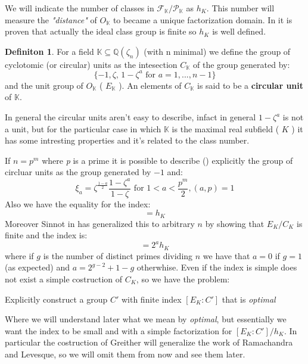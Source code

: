 \documentclass[]{article}
\theoremstyle{plain}
\theoremstyle{remark}
\theoremstyle{definition}
\newtheorem{deff}[teo]{Definiton}
\newcommand{\K}{\mathbb{K}}
\newcommand{\Q}{\mathbb{Q}}
\begin{document}
	We will indicate the number of classes in $ \mathcal{F}_\K / \mathcal{P}_\K $ as $ h_K $. This number will measure the \textit{"distance"} of $ O_\K $ to became a unique factorization domain. In \cite[Page~141]{RIN} it is proven that actually the ideal class group is finite so $ h_K $ is well defined. 

	
	\begin{deff}
		For a field $ \K \subseteq \Q (\zeta_n) $ (with n minimal) we define the group of cyclotomic (or circular) units as the intesection $ C_\K $ of the group generated by:
		\begin{equation*}
			\{ -1 ,  \zeta , \, 1 - \zeta ^a \text{ for } a = 1, ... , n-1 \}
		\end{equation*}
		and the unit group of $ O_\K $ ( $ E_{\K} $ ). An elements of $ C_\K $ is said to be a \textbf{circular unit} of $ \K $. 
	\end{deff}

	In general the circular units aren't easy to describe, infact in general $ 1 - \zeta ^a $ is not a unit, but for the particular case in which $ \K $ is the maximal real subfield ( $ K $ ) it has some intresting properties and it's related to the class number.
	
	
	If $ n=p^m $ where \textit{p} is a prime it is possible to describe (\cite[Lemma~8.1, Theorem~8.2]{CF}) explicitly the group of circluar units as the group generated by $ -1 $ and:
	\[
		\xi_a = \zeta^{ \frac{1-a}{2}} \frac{1 - \zeta ^a}{1 - \zeta } \text{ for } 1 < a < \frac{p^m}{2}, (a,p)=1
	\]
	Also we have the equality for the index:
	\begin{equation*}
		[ E_K : C_K ] = h_K
	\end{equation*}
	Moreover Sinnot in \cite{SIN} has generalized this to arbitrary $ n $ by showing that $ E_K / C_K $ is finite and the index is:
	 \begin{equation*}
		 [ E_K : C_K ] = 2^a h_K
	 \end{equation*}
	 where if $ g $ is the number of distinct primes dividing $ n $ we have that $ a=0 $ if $ g=1 $ (as expected) and $ a = 2^{g-2} + 1 - g $ otherwhise. 
	 Even if the index is simple does not exist a simple costruction of $ C_K $, so we have the problem:
	 
	 \begin{tcolorbox}
	 	Explicitly construct a group $ C' $ with finite index $ [ E_K : C' ] $ that is \textit{optimal}
	 \end{tcolorbox}
 
 	Where we will understand later what we mean by \textit{optimal}, but essentially we want the index to be small and with a simple factorization for $ [ E_K : C' ] / h_K $. In particular the costruction of Greither will generalize the work of Ramachandra and Levesque, so we will omit them from now and see them later. 
	 
\end{document}
